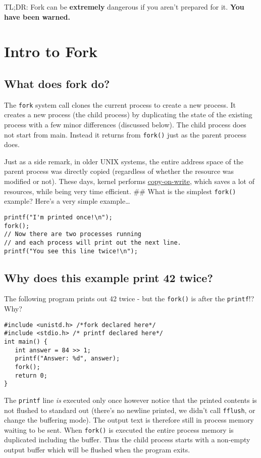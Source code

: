 TL;DR: Fork can be \textbf{extremely} dangerous if you aren't prepared
for it. \textbf{You have been warned.}

\section{Intro to Fork}\label{intro-to-fork}

\subsection{What does fork do?}\label{what-does-fork-do}

The \texttt{fork} system call clones the current process to create a new
process. It creates a new process (the child process) by duplicating the
state of the existing process with a few minor differences (discussed
below). The child process does not start from main. Instead it returns
from \texttt{fork()} just as the parent process does.

Just as a side remark, in older UNIX systems, the entire address space
of the parent process was directly copied (regardless of whether the
resource was modified or not). These days, kernel performs
\href{https://en.wikipedia.org/wiki/Copy-on-write}{copy-on-write}, which
saves a lot of resources, while being very time efficient. \#\# What is
the simplest \texttt{fork()} example? Here's a very simple
example\ldots{}

\begin{verbatim}
printf("I'm printed once!\n");
fork();
// Now there are two processes running
// and each process will print out the next line.
printf("You see this line twice!\n");
\end{verbatim}

\subsection{Why does this example print 42
twice?}\label{why-does-this-example-print-42-twice}

The following program prints out 42 twice - but the \texttt{fork()} is
after the \texttt{printf}!? Why?

\begin{verbatim}
#include <unistd.h> /*fork declared here*/
#include <stdio.h> /* printf declared here*/
int main() {
   int answer = 84 >> 1;
   printf("Answer: %d", answer);
   fork();
   return 0;
}
\end{verbatim}

The \texttt{printf} line \emph{is} executed only once however notice
that the printed contents is not flushed to standard out (there's no
newline printed, we didn't call \texttt{fflush}, or change the buffering
mode). The output text is therefore still in process memory waiting to
be sent. When \texttt{fork()} is executed the entire process memory is
duplicated including the buffer. Thus the child process starts with a
non-empty output buffer which will be flushed when the program exits.

